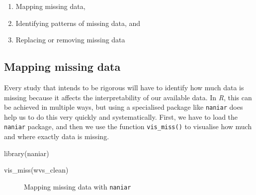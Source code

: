 \documentclass[
  letterpaper,
]{krantz}
\makeatletter
\newenvironment{Shaded}{\begin{snugshade}}{\end{snugshade}}
\newcommand{\FunctionTok}[1]{\textcolor[rgb]{0.28,0.35,0.67}{#1}}
\newcommand{\NormalTok}[1]{\textcolor[rgb]{0.00,0.23,0.31}{#1}}
\newenvironment{kframe}{%
\medskip{}
\setlength{\fboxsep}{.8em}
 \def\at@end@of@kframe{}%
 \ifinner\ifhmode%
  \def\at@end@of@kframe{\end{minipage}}%
  \begin{minipage}{\columnwidth}%
 \fi\fi%
 \def\FrameCommand##1{\hskip\@totalleftmargin \hskip-\fboxsep
 \colorbox{shadecolor}{##1}\hskip-\fboxsep
     \hskip-\linewidth \hskip-\@totalleftmargin \hskip\columnwidth}%
 \MakeFramed {\advance\hsize-\width
   \@totalleftmargin\z@ \linewidth\hsize
   \@setminipage}}%
 {\par\unskip\endMakeFramed%
 \at@end@of@kframe}
\renewenvironment{Shaded}{\begin{kframe}}{\end{kframe}}
\makeatother
\begin{document}
\begin{enumerate}
\def\labelenumi{\arabic{enumi}.}
\item
  Mapping missing data,
\item
  Identifying patterns of missing data, and
\item
  Replacing or removing missing data
\end{enumerate}

\subsection{Mapping missing data}\label{sec-mapping-missing-data}

Every study that intends to be rigorous will have to identify how much
data is missing because it affects the interpretability of our available
data. In \emph{R}, this can be achieved in multiple ways, but using a
specialised package like \texttt{naniar} does help us to do this very
quickly and systematically. First, we have to load the \texttt{naniar}
package, and then we use the function \texttt{vis\_miss()} to visualise
how much and where exactly data is missing.

\begin{Shaded}
\begin{Highlighting}[]
\FunctionTok{library}\NormalTok{(naniar)}

\FunctionTok{vis\_miss}\NormalTok{(wvs\_clean)}
\end{Highlighting}
\end{Shaded}

\begin{figure}[H]


\caption{\label{fig-mapping-missing-data}Mapping missing data with
\texttt{naniar}}

\end{figure}%
\end{document}
